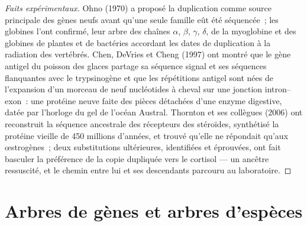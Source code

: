 \begin{proof}[Faits expérimentaux]
Ohno (1970) a proposé la duplication comme source principale des gènes
neufs avant qu'une seule famille eût été séquencée~; les globines l'ont
confirmé, leur arbre des chaînes $\alpha$, $\beta$, $\gamma$, $\delta$,
de la myoglobine et des globines de plantes et de bactéries accordant
les dates de duplication à la radiation des vertébrés. Chen, DeVries et
Cheng (1997) ont montré que le gène antigel du poisson des glaces
partage sa séquence signal et ses séquences flanquantes avec le
trypsinogène et que les répétitions antigel sont nées de l'expansion
d'un morceau de neuf nucléotides à cheval sur une jonction
intron--exon~: une protéine neuve faite des pièces détachées d'une
enzyme digestive, datée par l'horloge du gel de l'océan Austral.
Thornton et ses collègues (2006) ont reconstruit la séquence ancestrale
des récepteurs des stéroïdes, synthétisé la protéine vieille de 450
millions d'années, et trouvé qu'elle ne répondait qu'aux œstrogènes~;
deux substitutions ultérieures, identifiées et éprouvées, ont fait
basculer la préférence de la copie dupliquée vers le cortisol --- un
ancêtre ressuscité, et le chemin entre lui et ses descendants parcouru
au laboratoire.
\end{proof}

\section{Arbres de gènes et arbres d'espèces}

